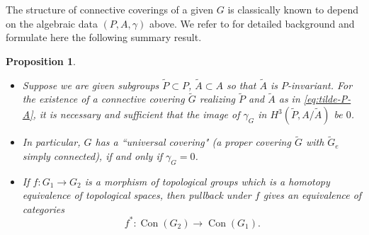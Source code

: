 \documentclass[english,11pt,leqno]{article}
\def\on{\operatorname}
\def\lra{\longrightarrow}
\newtheorem{prop}[thm]{Proposition}
\theoremstyle{definition}
\theoremstyle{remark}
\numberwithin{equation}{section}
\begin{document}
The structure of connective coverings of a given $G$ is classically known to depend on the algebraic
data $(P,A,\gamma)$ above. We refer to \cite{taylor, brown-mucuk} for detailed background and formulate
here the following summary result.

\begin{prop}\label{prop:summary-covers}
\begin{itemize}
\item[(a)] Suppose we are given subgroups $\widetilde P\subset P$, $\widetilde A\subset A$ so that $\widetilde A$ 
is $P$-invariant. For the existence of a connective covering $\widetilde G$ realizing $\widetilde P$ and $\widetilde A$
as in \eqref{eq:tilde-P-A}, it is necessary and sufficient that the image of $\gamma_G$ in $H^3(\widetilde P, A/\widetilde A)$
be $0$.

\item[(b)] In particular, $G$ has a ``universal covering" (a proper covering $\widetilde G$ with $\widetilde G_e$
simply connected), if and only if $\gamma_G=0$. 

\item[(c)] If $f: G_1\to G_2$ is a morphism of topological groups which is a homotopy equivalence of topological
spaces, then pullback under $f$ gives an equivalence of categories
\[
f^*: \on{Con}(G_2)\lra\on{Con}(G_1). 
\]
\end{itemize}
\end{prop}
\end{document}
